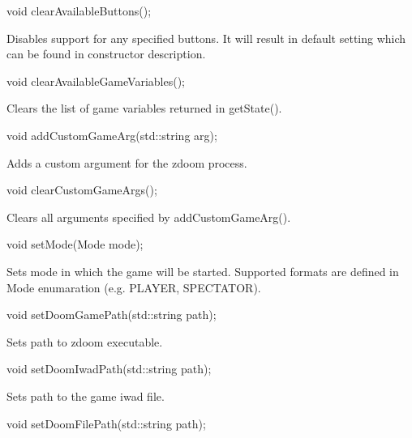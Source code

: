 \vspace{20pt}
\begin{clinee}
void clearAvailableButtons();
\end{clinee}

Disables support for any specified buttons. It will result in default setting which can be found in constructor description.


\vspace{20pt}
\begin{clinee}
void clearAvailableGameVariables();
\end{clinee}

Clears the list of game variables returned in getState().


\vspace{20pt}
\begin{clinee}
void addCustomGameArg(std::string arg);
\end{clinee}

Adds a custom argument for the zdoom process. %


\vspace{20pt}
\begin{clinee}
void clearCustomGameArgs();
\end{clinee}

Clears all arguments specified by addCustomGameArg().


\vspace{20pt}
\begin{clinee}
void setMode(Mode mode);
\end{clinee}

Sets mode in which the game will be started. Supported formats are defined in Mode enumaration (e.g. PLAYER, SPECTATOR).


\vspace{20pt}
\begin{clinee}
void setDoomGamePath(std::string path);
\end{clinee}

Sets path to zdoom executable.


\vspace{20pt}
\begin{clinee}
void setDoomIwadPath(std::string path);
\end{clinee}

Sets path to the game iwad file.


\vspace{20pt}
\begin{clinee}
void setDoomFilePath(std::string path);
\end{clinee}

